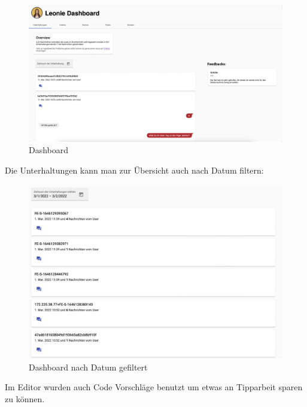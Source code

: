 \begin{figure}[hbt!]
    \centering
    \includegraphics[scale=0.2]{pics/dashboardConvo}
    \caption{Dashboard}
    \label{fig:impl:dashConv}
\end{figure}

Die Unterhaltungen kann man zur Übersicht auch nach Datum filtern:

\begin{figure}[hbt!]
    \centering
    \includegraphics[scale=0.2]{pics/dashboardDate}
    \caption{Dashboard nach Datum gefiltert}
    \label{fig:impl:dashboardDate}
\end{figure}

Im Editor wurden auch Code Vorschläge benutzt um etwas an Tipparbeit sparen zu können.


